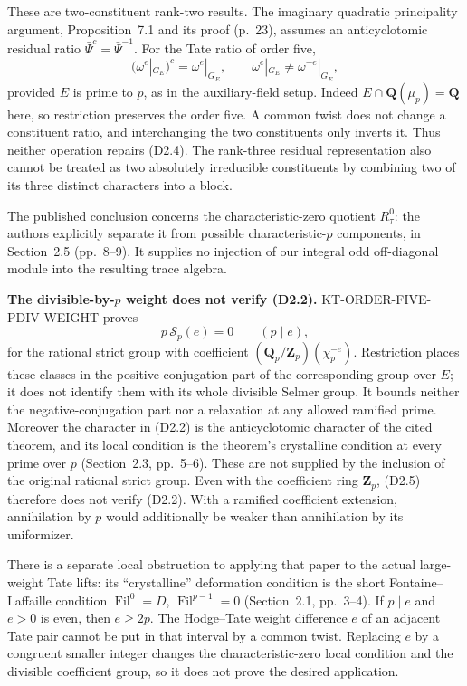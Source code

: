\documentclass[11pt,a4paper]{article}
\theoremstyle{definition}
\renewcommand{\paragraph}[1]{\par\smallskip\noindent\textbf{#1}\quad\ignorespaces}
\begin{document}
These are two-constituent rank-two results.  The imaginary
quadratic principality argument, Proposition~7.1 and its proof
(p.~23), assumes an anticyclotomic residual ratio
$\bar\Psi^c=\bar\Psi^{-1}$.  For the Tate ratio of order five,
\[
 (\omega^{e}|_{G_E})^c=\omega^{e}|_{G_E},
 \qquad \omega^{e}|_{G_E}\ne\omega^{-e}|_{G_E},                 \tag{D2.4}
\]
provided $E$ is prime to $p$, as in the auxiliary-field setup.
Indeed $E\cap\mathbf Q(\mu_p)=\mathbf Q$ here, so restriction
preserves the order five.  A common twist does not change a
constituent ratio, and interchanging the two constituents only
inverts it.  Thus neither operation repairs (D2.4).
The rank-three residual representation also cannot be treated as
two absolutely irreducible constituents by combining two of its
three distinct characters into a block.

The published conclusion concerns the characteristic-zero
quotient $R_\tau^0$: the authors explicitly separate it from
possible characteristic-$p$ components, in Section~2.5
(pp.~8--9).  It supplies no injection of our integral odd
off-diagonal module into the resulting trace algebra.

\paragraph{The divisible-by-$p$ weight does not verify (D2.2).}
KT-ORDER-FIVE-PDIV-WEIGHT proves
\[
 p\,\mathcal S_p(e)=0\qquad(p\mid e),                         \tag{D2.5}
\]
for the rational strict group with coefficient
$(\mathbf Q_p/\mathbf Z_p)(\chi_p^{-e})$.
Restriction places these classes in the positive-conjugation
part of the corresponding group over $E$; it does not identify
them with its whole divisible Selmer group.  It bounds neither
the negative-conjugation part nor a relaxation at any allowed
ramified prime.  Moreover the character in (D2.2) is the
anticyclotomic character of the cited theorem, and its local
condition is the theorem's crystalline condition at every
prime over $p$ (Section~2.3, pp.~5--6).  These are not supplied
by the inclusion of the original rational strict group.
Even with the coefficient ring $\mathbf Z_p$, (D2.5) therefore
does not verify (D2.2).  With a ramified coefficient extension,
annihilation by $p$ would additionally be weaker than
annihilation by its uniformizer.

There is a separate local obstruction to applying that paper to
the actual large-weight Tate lifts: its ``crystalline'' deformation
condition is the short Fontaine--Laffaille condition
$\operatorname{Fil}^0=D$, $\operatorname{Fil}^{p-1}=0$
(Section~2.1, pp.~3--4).  If $p\mid e$ and $e>0$ is even, then
$e\geq2p$.  The Hodge--Tate weight difference $e$ of an adjacent
Tate pair cannot be put in that interval by a common twist.
Replacing $e$ by a congruent smaller integer changes the
characteristic-zero local condition and the divisible
coefficient group, so it does not prove the desired application.
\end{document}
